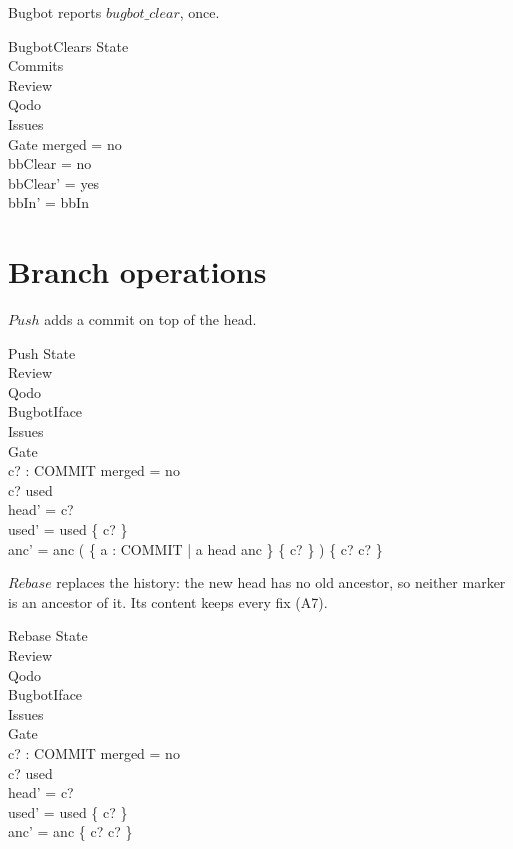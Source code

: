 \documentclass{article}
\begin{document}
Bugbot reports $bugbot\_clear$, once.

\begin{schema}{BugbotClears}
  \Delta State \\
  \Xi Commits \\
  \Xi Review \\
  \Xi Qodo \\
  \Xi Issues \\
  \Xi Gate
\where
  merged = no \\
  bbClear = no \\
  bbClear' = yes \\
  bbIn' = bbIn
\end{schema}

\section{Branch operations}

$Push$ adds a commit on top of the head.

\begin{schema}{Push}
  \Delta State \\
  \Xi Review \\
  \Xi Qodo \\
  \Xi BugbotIface \\
  \Xi Issues \\
  \Xi Gate \\
  c? : COMMIT
\where
  merged = no \\
  c? \notin used \\
  head' = c? \\
  used' = used \cup \{ c? \} \\
  anc' = anc \cup ( \{ a : COMMIT | a \mapsto head \in anc \} \cross \{ c? \} ) \cup \{ c? \mapsto c? \}
\end{schema}

$Rebase$ replaces the history: the new head has no old ancestor, so neither
marker is an ancestor of it. Its content keeps every fix (A7).

\begin{schema}{Rebase}
  \Delta State \\
  \Xi Review \\
  \Xi Qodo \\
  \Xi BugbotIface \\
  \Xi Issues \\
  \Xi Gate \\
  c? : COMMIT
\where
  merged = no \\
  c? \notin used \\
  head' = c? \\
  used' = used \cup \{ c? \} \\
  anc' = anc \cup \{ c? \mapsto c? \}
\end{schema}
\end{document}

